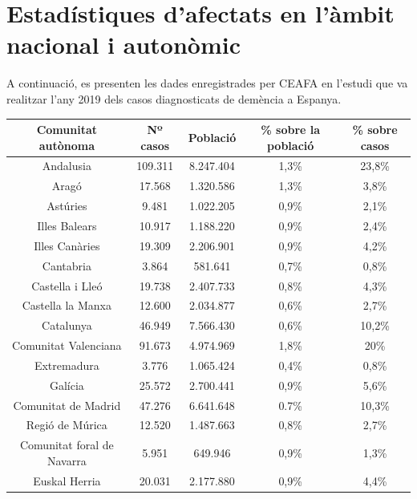 \documentclass[a4paper,12pt]{report}
\begin{document}
\section*{Estadístiques d'afectats en l'àmbit nacional i autonòmic}
A continuació, es presenten les dades enregistrades per CEAFA en l'estudi que va realitzar l'any 2019 dels casos diagnosticats de demència a Espanya.
\begin{table}[h]
    \centering
    \begin{tabular}{ |c | c | c | c | c| } 
        \hline
        \hline Comunitat autònoma & Nº casos & Població & \% sobre la població & \% sobre casos\\
        \hline
         Andalusia & 109.311 & 8.247.404 & 1,3\% & 23,8\% \\
         \hline
         Aragó & 17.568 & 1.320.586 & 1,3\% & 3,8\% \\
         \hline
         Astúries & 9.481 & 1.022.205 & 0,9\% & 2,1\% \\
         \hline
         Illes Balears & 10.917 & 1.188.220 & 0,9\% & 2,4\% \\
          \hline
         Illes Canàries & 19.309 & 2.206.901 & 0,9\% & 4,2\% \\
          \hline
         Cantabria & 3.864 & 581.641 & 0,7\% & 0,8\% \\
          \hline
         Castella i Lleó & 19.738 & 2.407.733 & 0,8\% & 4,3\% \\
          \hline
         Castella la Manxa & 12.600 & 2.034.877 & 0,6\% & 2,7\% \\
          \hline
         Catalunya & 46.949 & 7.566.430 & 0,6\% & 10,2\% \\
          \hline
         Comunitat Valenciana & 91.673 & 4.974.969 & 1,8\% & 20\% \\ 
          \hline
         Extremadura & 3.776 & 1.065.424 & 0,4\% & 0,8\% \\
          \hline
         Galícia & 25.572 & 2.700.441 & 0,9\% & 5,6\% \\ 
          \hline
         Comunitat de Madrid & 47.276 & 6.641.648 & 0.7\% & 10,3\% \\ 
         \hline
         Regió de Múrica & 12.520 & 1.487.663 & 0,8\% & 2,7\% \\
          \hline
         Comunitat foral de Navarra & 5.951 & 649.946 & 0,9\% & 1,3\% \\ 
          \hline
         Euskal Herria & 20.031 & 2.177.880 & 0,9\% & 4,4\% \\ 

\end{tabular}
\end{table}
\end{document}
